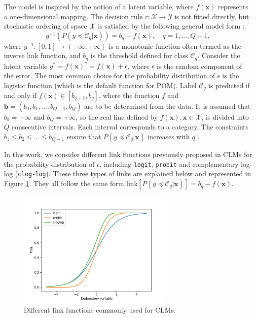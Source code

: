 \documentclass[journal]{IEEEtran}
\begin{document}
	The model is inspired by the notion of a latent variable, where $f(\textbf{x})$ represents a one-dimensional mapping. The decision rule $r: \mathcal{X} \rightarrow \mathcal{Y}$ is not fitted directly, but stochastic ordering of space $\mathcal{X}$ is satisfied by the following general model form \cite{herbrich2000large}:
	\begin{equation}
		\nonumber
		g^{-1}(P(y \preceq \mathcal{C}_q | \mathbf{x})) = b_q - f(\mathbf{x}), \quad q = 1, ..., Q-1,
	\end{equation}
	where $g^{-1} : [0,1] \rightarrow (-\infty, +\infty)$ is a monotonic function often termed as the inverse link function, and $b_q$ is the threshold defined for class $\mathcal{C}_q$. Consider the latent variable $y^* = f(\mathbf{x})^* = f(\mathbf{x}) + \epsilon$, where $\epsilon$ is the random component of the error. The most common choice for the probability distribution of $\epsilon$ is the logistic function (which is the default function for POM). Label $\mathcal{C}_q$ is predicted if and only if $f(\mathbf{x}) \in [b_{q-1}, b_q]$, where the function $f$ and $\mathbf{b} = (b_0, b_1, ..., b_{Q-1}, b_Q)$ are to be determined from the data. It is assumed that $b_0 = -\infty$ and $b_Q = +\infty$, so the real line defined by $f(\textbf{x}), \textbf{x} \in \mathcal{X}$, is divided into $Q$ consecutive intervals. Each interval corresponds to a category. The constraints $b_1 \le b_2 \le ... \le b_{Q-1}$ ensure that $P(y \preceq \mathcal{C}_q | \mathbf{x})$ increases with $q$ \cite{mccullagh1980regression}.
	
	In this work, we consider different link functions previously proposed in CLMs for the probability distribution of $\epsilon$, including \texttt{logit}, \texttt{probit} and complementary log-log (\texttt{clog-log}). These three types of links are explained below and represented in Figure \ref{fig:linkfunctions}. They all follow the same form $\text{link}[P(y \preceq \mathcal{C}_q | \mathbf{x})] = b_q - f(\mathbf{x})$.
			
	\begin{figure}[!t]
		\centering
		\includegraphics[width=3in]{img/linkfunctions.pdf}
		\caption{Different link functions commonly used for CLMs.}
		\label{fig:linkfunctions}
	\end{figure}
\end{document}
